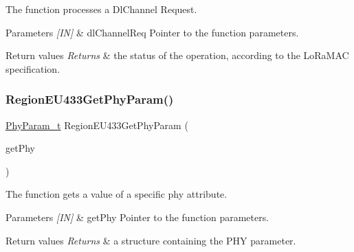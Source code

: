 The function processes a Dl\+Channel Request. 


\begin{DoxyParams}{Parameters}
{\em \mbox{[}\+I\+N\mbox{]}} & dl\+Channel\+Req Pointer to the function parameters.\\
\hline
\end{DoxyParams}

\begin{DoxyRetVals}{Return values}
{\em Returns} & the status of the operation, according to the Lo\+Ra\+M\+AC specification. \\
\hline
\end{DoxyRetVals}
\mbox{\label{group__REGIONEU433_ga407d34fe6c7dea18b07732d03b62894b}} 
\subsubsection{\texorpdfstring{Region\+E\+U433\+Get\+Phy\+Param()}{RegionEU433GetPhyParam()}}
{\footnotesize\ttfamily \hyperlink{group__REGION_gaed159b26e5c4677236b6e8677019db30}{Phy\+Param\+\_\+t} Region\+E\+U433\+Get\+Phy\+Param (\begin{DoxyParamCaption}\item[{\hyperlink{group__REGION_gab471483fff904f4f89bbc03f7fc380ab}{Get\+Phy\+Params\+\_\+t} $\ast$}]{get\+Phy }\end{DoxyParamCaption})}



The function gets a value of a specific phy attribute. 


\begin{DoxyParams}{Parameters}
{\em \mbox{[}\+I\+N\mbox{]}} & get\+Phy Pointer to the function parameters.\\
\hline
\end{DoxyParams}

\begin{DoxyRetVals}{Return values}
{\em Returns} & a structure containing the P\+HY parameter. \\
\hline
\end{DoxyRetVals}
\mbox{\label{group__REGIONEU433_ga1961913d7b9857e1804f455b59428186}} 

